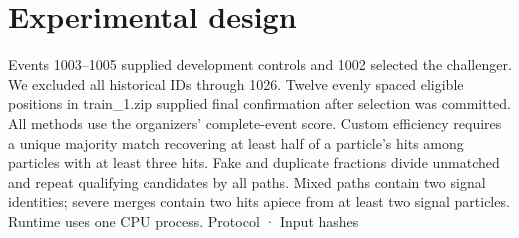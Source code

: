 \documentclass[10pt]{article}
\begin{document}
\section*{Experimental design}
Events 1003–1005 supplied development controls and 1002 selected the challenger. We excluded all historical IDs through 1026. Twelve evenly spaced eligible positions in train\_1.zip supplied final confirmation after selection was committed. All methods use the organizers’ complete-event score. Custom efficiency requires a unique majority match recovering at least half of a particle’s hits among particles with at least three hits. Fake and duplicate fractions divide unmatched and repeat qualifying candidates by all paths. Mixed paths contain two signal identities; severe merges contain two hits apiece from at least two signal particles. Runtime uses one CPU process. Protocol · Input hashes\par
\clearpage
\end{document}
